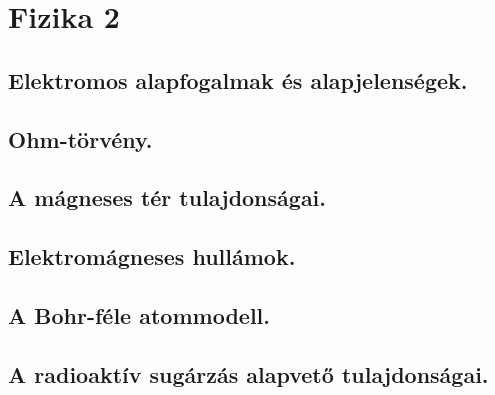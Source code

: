 \section{Fizika 2}
\subsection{Elektromos alapfogalmak és alapjelenségek.}

\subsection{Ohm-törvény.}

\subsection{A mágneses tér tulajdonságai. }

\subsection{Elektromágneses hullámok. }

\subsection{A Bohr-féle atommodell.}

\subsection{A radioaktív sugárzás alapvető tulajdonságai.}
